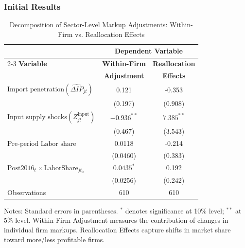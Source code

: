 \documentclass[12pt]{article}
\begin{document}
\subsubsection{Initial Results}
    \begin{table}[htbp]
    \centering
    \caption{Decomposition of Sector-Level Markup Adjustments: Within-Firm vs. Reallocation Effects}
    \label{tab:decomposition_results}
    \begin{threeparttable}
    \begin{tabular}{lcc}
    \toprule
    & \multicolumn{2}{c}{\textbf{Dependent Variable}} \\
    \cmidrule(lr){2-3}
    \textbf{Variable} & \textbf{Within-Firm} & \textbf{Reallocation} \\
    & \textbf{Adjustment} & \textbf{Effects} \\
    \midrule
    $\text{Import penetration} (\widehat{\Delta IP}_{jt})$ & 0.121 & -0.353 \\
    & (0.197) & (0.908) \\
    $\text{Input supply shocks} (Z_{jt}^{\text{Input}})$ & $-0.936^{**}$ & $7.385^{**}$ \\
    & (0.467) & (3.543) \\
    $\text{Pre-period Labor share}$ & 0.0118 & -0.214 \\
    & (0.0460) & (0.383) \\
    $\text{Post2016}_t \times \text{LaborShare}_{jt_0}$ & $0.0435^{*}$ & 0.192 \\
    & (0.0256) & (0.242) \\
    \midrule
    Observations & 610 & 610 \\
    \bottomrule
    \end{tabular}
    \begin{tablenotes}
    \small
    \item Notes: Standard errors in parentheses. $^{*}$ denotes significance at 10\% level; $^{**}$ at 5\% level. Within-Firm Adjustment measures the contribution of changes in individual firm markups. Reallocation Effects capture shifts in market share toward more/less profitable firms.
    \end{tablenotes}
    \end{threeparttable}
\end{table}
\end{document}
